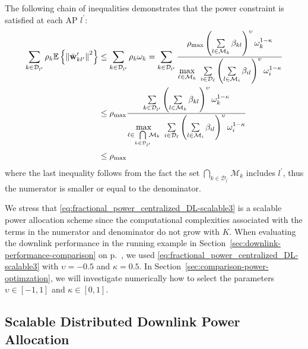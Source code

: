The following chain of inequalities demonstrates that the power constraint is satisfied at each AP $l^{\prime}$:
\begin{align}\label{eq:fractional_power_centralized_DL-scalable3_power}
\sum_{k\in\mathcal{D}_{l^{\prime}}}\rho_k\mathbb{E} \left\{ \left\| \bar{\mathbf{w}}_{kl^{\prime}}^{\prime} \right\|^2 \right\}&\leq \sum_{k\in\mathcal{D}_{l^{\prime}}}\rho_k\omega_k =\sum\limits_{k\in\mathcal{D}_{l^{\prime}}} \frac{\rho_{\textrm{max}}\left(\sum\limits_{l\in\mathcal{M}_k}\beta_{kl}\right)^{\upsilon}\omega_k^{1-\kappa}}{\underset{\ell\in \mathcal{M}_k}{\max} \  \sum\limits_{i\in \mathcal{D}_{\ell}}   \left(\sum\limits_{l\in\mathcal{M}_i}\beta_{il}\right)^{\upsilon}\omega_i^{1-\kappa}} \nonumber\\
& \leq  \rho_{\textrm{max}}\frac{\sum\limits_{k\in\mathcal{D}_{l^{\prime}}}\left(\sum\limits_{l\in\mathcal{M}_k}\beta_{kl}\right)^{\upsilon}\omega_k^{1-\kappa}}{\underset{\ell\in \bigcap\limits_{k\in \mathcal{D}_{l^{\prime}}}\!\!\!\mathcal{M}_k}{\max} \  \sum\limits_{i\in \mathcal{D}_{\ell}}   \left(\sum\limits_{l\in\mathcal{M}_i}\beta_{il}\right)^{\upsilon}\omega_i^{1-\kappa}} \nonumber\\
&\leq  \rho_{\textrm{max}}
\end{align}
where the last inequality follows from the fact the set $\bigcap_{k\in \mathcal{D}_{l^{\prime}}}\!\!\mathcal{M}_k$ includes $l^{\prime}$, thus the numerator is smaller or equal to the denominator.

We stress that \eqref{eq:fractional_power_centralized_DL-scalable3} is a scalable power allocation scheme since the computational complexities associated with the terms in the numerator and denominator do not grow with $K$. When evaluating the downlink performance in the running example in Section~\ref{sec:downlink-performance-comparison} on p.~\pageref{sec:downlink-performance-comparison}, we used \eqref{eq:fractional_power_centralized_DL-scalable3} with $\upsilon = -0.5$ and $\kappa=0.5$. In Section~\ref{sec:comparison-power-optimzation}, we will investigate numerically how to select the parameters $\upsilon \in [-1,1]$ and $\kappa \in [0,1]$.

\subsection{Scalable Distributed Downlink Power Allocation}

